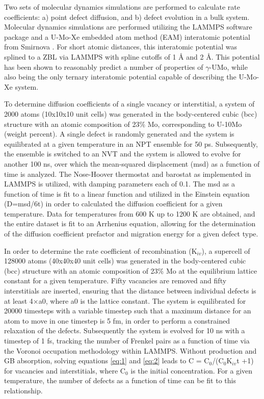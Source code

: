 \documentclass[review]{elsarticle}
\begin{document}
Two sets of molecular dynamics simulations are performed to calculate rate coefficients: a) point defect diffusion, and b) defect evolution in a bulk system. Molecular dynamics simulations are performed utilizing the LAMMPS \cite{plimpton1995} software package and a U-Mo-Xe embedded atom method (EAM) interatomic potential from Smirnova \cite{smirnovaUMo}. For short atomic distances, this interatomic potential was splined to a ZBL \cite{zbl} via LAMMPS with spline cutoffs of 1 {\AA} and 2 {\AA}. This potential has been shown to reasonably predict a number of properties of $\gamma$-UMo, while also being the only ternary interatomic potential capable of describing the U-Mo-Xe system. 

To determine diffusion coefficients of a single vacancy or interstitial, a system of 2000 atoms (10x10x10 unit cells) was generated in the body-centered cubic (bcc) structure with an atomic composition of 23\% Mo, corresponding to U-10Mo (weight percent). A single defect is randomly generated and the system is equilibrated at a given temperature in an NPT ensemble for 50 ps. Subsequently, the ensemble is switched to an NVT and the system is allowed to evolve for another 100 ns, over which the mean-squared displacement (msd) as a function of time is analyzed. The Nose-Hoover thermostat and barostat as implemented in LAMMPS is utilized, with damping parameters each of 0.1. The msd as a function of time is fit to a linear function and utilized in the Einstein equation (D=msd/6t) in order to calculated the diffusion coefficient for a given temperature. Data for temperatures from 600 K up to 1200 K are obtained, and the entire dataset is fit to an Arrhenius equation, allowing for the determination of the diffusion coefficient prefactor and migration energy for a given defect type. 

In order to determine the rate coefficient of recombination (K$_{iv}$), a supercell of 128000 atoms (40x40x40 unit cells) was generated in the body-centered cubic (bcc) structure with an atomic composition of 23\% Mo at the equilibrium lattice constant for a given temperature. Fifty vacancies are removed and fifty interstitials are inserted, ensuring that the distance between individual defects is at least 4$\times$a0, where a0 is the lattice constant. The system is equilibrated for 20000 timesteps with a variable timestep such that a maximum distance for an atom to move in one timestep is 5 fm, in order to perform a constrained relaxation of the defects. Subsequently the system is evolved for 10 ns with a timestep of 1 fs, tracking the number of Frenkel pairs as a function of time via the Voronoi occupation methodology within LAMMPS. Without production and GB absorption, solving equations \ref{eq:1} and \ref{eq:2} leads to C = C$_0$/(C$_0$K$_{iv}$t +1) for vacancies and interstitials, where C$_0$ is the initial concentration. For a given temperature, the number of defects as a function of time can be fit to this relationship. 
\end{document}

